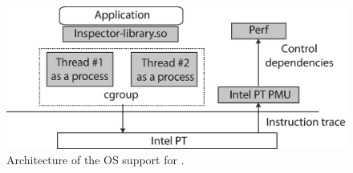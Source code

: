 
\begin{figure}[t]

\centering
      \includegraphics[scale=.35]{figure/PT-os}
  \caption{Architecture of the OS support for \intelpt.}
   
  \label{fig:pt-OS-support}

\end{figure}

